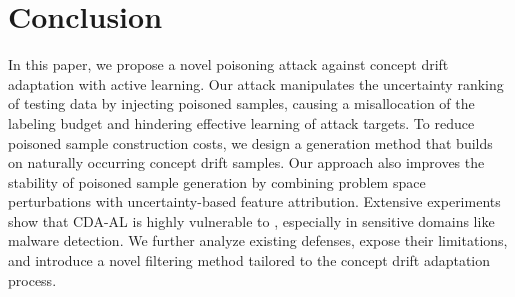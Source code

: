 \section{Conclusion}
In this paper, we propose a novel poisoning attack against concept drift adaptation with active learning.
Our attack manipulates the uncertainty ranking of testing data by injecting poisoned samples, causing a misallocation of the labeling budget and hindering effective learning of attack targets.
To reduce poisoned sample construction costs, we design a generation method that builds on naturally occurring concept drift samples.
Our approach also improves the stability of poisoned sample generation by combining problem space perturbations with uncertainty-based feature attribution.
Extensive experiments show that CDA-AL is highly vulnerable to \pandora, especially in sensitive domains like malware detection.
We further analyze existing defenses, expose their limitations, and introduce a novel filtering method tailored to the concept drift adaptation process.